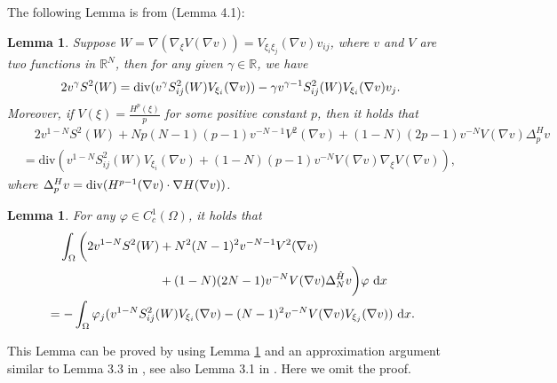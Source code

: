 \documentclass[reqno, 11pt]{amsart} %
\numberwithin{equation}{section}
\newtheorem{lemma}[thm]{Lemma}
\theoremstyle{definition}
\newcommand{\R}{\mathbb{R}}
\newcommand{\dx}{\textup{d}x}
\begin{document}
The following Lemma is from  \cite{BC2018} (Lemma 4.1):

\begin{lemma}\label{lem1}
    Suppose $W = \nabla (\nabla_{\xi} V(\nabla v)) = V_{\xi_i \xi_j}(\nabla v) v_{ij}$, where $v$ and $V$ are two functions in $\R^N$, then for any given $\gamma \in \R$, we have
    \begin{align*}
        2 v^{\gamma} S^2(W) =  \textup{div} (v^{\gamma} S^2_{ij}(W) V_{\xi_i}(\nabla v)) - \gamma v^{\gamma -1} S^2_{ij}(W) V_{\xi_i}(\nabla v) v_j.
    \end{align*}
    Moreover, if $V(\xi) = \frac{H^p(\xi)}{p}$ for some positive constant $p$, then it holds that
    \begin{align*}
        &\quad2 v^{1-N} S^2(W)  +  Np(N-1)(p-1) v^{-N-1} V^2(\nabla v) + (1-N)(2p-1)v^{-N} V(\nabla v) \Delta_p^{H} v \\
        & = \text{div} (v^{1-N} S^2_{ij}(W) V_{\xi_i}(\nabla v) + (1-N)(p-1) v^{-N}V(\nabla v) \nabla_{\xi} V(\nabla v) ),
    \end{align*}
    where $\Delta_p^H v = \textup{div}(H^{p-1}(\nabla v) \cdot \nabla H(\nabla v))$.
\end{lemma}



\begin{lemma}\label{lem2}
    For any $\varphi \in C^1_c(\Omega)$, it holds that
    \begin{align}
        & \quad \int_{\Omega} \bigg( 2 v^{1-N} S^2(W) +  N^2(N-1)^2 v^{-N-1} V^2(\nabla v) \nonumber \\
        & \hspace{9em }+ (1-N)(2N-1)v^{-N} V(\nabla v) \Delta_N^{\hat{H}} v \bigg) \varphi \ \dx \label{2-1} \\
        & = - \int_{\Omega} \varphi_j (v^{1-N} S^2_{ij}(W) V_{\xi_i}(\nabla v) - (N-1)^2 v^{-N} V(\nabla v) V_{\xi_j}(\nabla v) ) \ \dx. \nonumber
    \end{align}
\end{lemma}

This Lemma can be proved by using Lemma \ref{lem1} and an approximation argument similar to Lemma 3.3 in \cite{CFR2020}, see also Lemma 3.1 in \cite{CCR2021}. Here we omit the proof.
\end{document}
